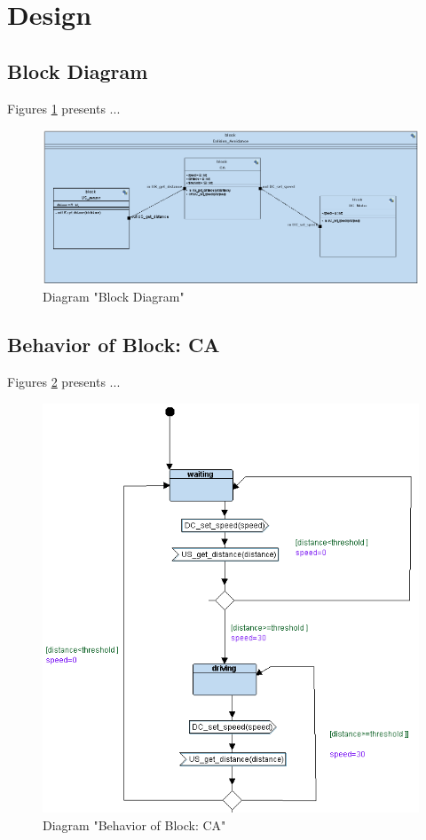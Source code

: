 
\section{Design}
\subsection{Block Diagram}
Figures \ref{fig:Block DiagramBlock Diagram00} presents ...
\begin{figure}[htb]
\centering
\includegraphics[width=\textwidth]{img_0_0.png}
\caption{Diagram "Block Diagram"}
\label{fig:Block DiagramBlock Diagram00}
\end{figure}

\subsection{Behavior of Block: CA}
Figures \ref{fig:CACA01} presents ...
\begin{figure}[htb]
\centering
\includegraphics[width=\textwidth]{img_0_1.png}
\caption{Diagram "Behavior of Block: CA"}
\label{fig:CACA01}
\end{figure}

